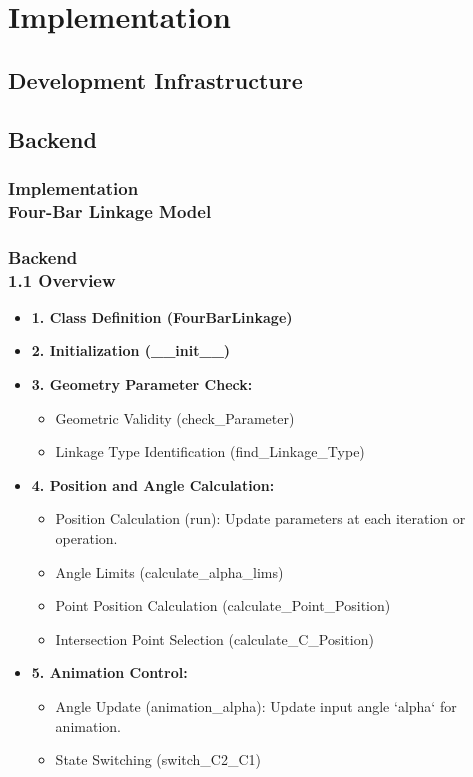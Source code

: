 \documentclass[ucs,10pt]{beamer}
\begin{document}
\section{Implementation}

\subsection{Development Infrastructure}

\subsection{Backend}

\begin{frame}
\frametitle{Implementation \\
	\small \color{rwth-blue} Four-Bar Linkage Model}
\end{frame}

\begin{frame}
    \frametitle{Backend \\ \small \color{rwth-blue} 1.1 Overview}
    \begin{itemize}
        \item \textbf{1. Class Definition (FourBarLinkage)}
        \item \textbf{2. Initialization (\_\_init\_\_)}
        \item \textbf{3. Geometry Parameter Check:}
        \begin{itemize}
            \item Geometric Validity (check\_Parameter)
            \item Linkage Type Identification (find\_Linkage\_Type)
        \end{itemize}
        \item \textbf{4. Position and Angle Calculation:}
        \begin{itemize}
            \item Position Calculation (run): Update parameters at each iteration or operation.
            \item Angle Limits (calculate\_alpha\_lims)
            \item Point Position Calculation (calculate\_Point\_Position)
            \item Intersection Point Selection (calculate\_C\_Position)
        \end{itemize}
        \item \textbf{5. Animation Control:}
        \begin{itemize}
            \item Angle Update (animation\_alpha): Update input angle `alpha` for animation.
            \item State Switching (switch\_C2\_C1)
        \end{itemize}
    \end{itemize}
\end{frame}
\end{document}
